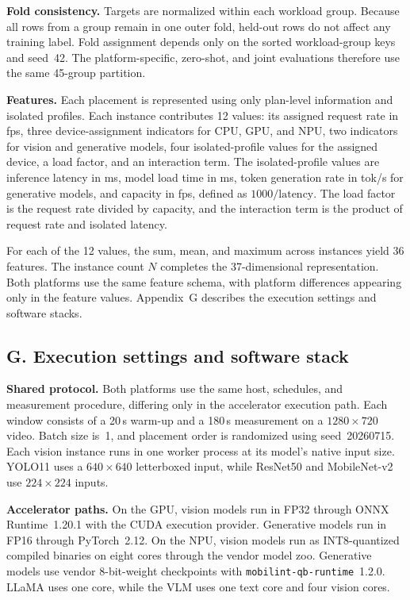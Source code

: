 \documentclass{article}
\begin{document}
\textbf{Fold consistency.} Targets are normalized within each workload group. Because all rows from a group remain in one outer fold, held-out rows do not affect any training label. Fold assignment depends only on the sorted workload-group keys and seed~42. The platform-specific, zero-shot, and joint evaluations therefore use the same 45-group partition.

\textbf{Features.} Each placement is represented using only plan-level information and isolated profiles. Each instance contributes 12 values: its assigned request rate in fps, three device-assignment indicators for CPU, GPU, and NPU, two indicators for vision and generative models, four isolated-profile values for the assigned device, a load factor, and an interaction term. The isolated-profile values are inference latency in ms, model load time in ms, token generation rate in tok/s for generative models, and capacity in fps, defined as $1000/\mathrm{latency}$. The load factor is the request rate divided by capacity, and the interaction term is the product of request rate and isolated latency.

For each of the 12 values, the sum, mean, and maximum across instances yield 36 features. The instance count $N$ completes the 37-dimensional representation. Both platforms use the same feature schema, with platform differences appearing only in the feature values. Appendix~G describes the execution settings and software stacks.


\subsection*{G. Execution settings and software stack}
\textbf{Shared protocol.} Both platforms use the same host, schedules, and measurement procedure, differing only in the accelerator execution path. Each window consists of a 20\,s warm-up and a 180\,s measurement on a $1280{\times}720$ video. Batch size is~1, and placement order is randomized using seed~20260715. Each vision instance runs in one worker process at its model's native input size. YOLO11 uses a $640{\times}640$ letterboxed input, while ResNet50 and MobileNet-v2 use $224{\times}224$ inputs.

\textbf{Accelerator paths.} On the GPU, vision models run in FP32 through ONNX Runtime~1.20.1 with the CUDA execution provider. Generative models run in FP16 through PyTorch~2.12. On the NPU, vision models run as INT8-quantized compiled binaries on eight cores through the vendor model zoo. Generative models use vendor 8-bit-weight checkpoints with \texttt{mobilint-qb-runtime}~1.2.0. LLaMA uses one core, while the VLM uses one text core and four vision cores.
\end{document}
